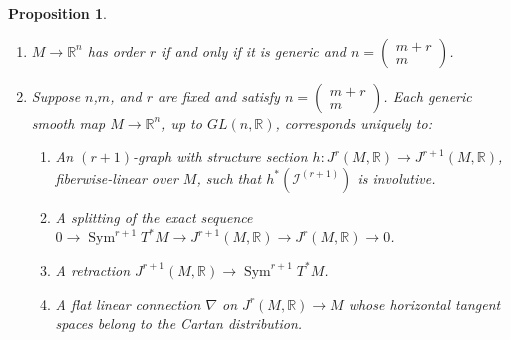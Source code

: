 \documentclass[12pt]{article}
\numberwithin{equation}{section}
\theoremstyle{plain}
\newtheorem{proposition}[definition]{Proposition}
\theoremstyle{definition}
\newcommand{\GL}{GL}
\newcommand{\R}{\mathbb{R}}
\newcommand{\ra}{\rightarrow}
\begin{document}
\begin{proposition}\label{cag}\
\begin{enumerate}
\item{\label{genlc}$M\ra \R^{n}$ has order $r$ if and only if it is generic and $n=\begin{pmatrix}m+r \\ m\end{pmatrix}$.}
\item{\label{eql}Suppose $n$,$m$, and $r$ are fixed and satisfy $n=\begin{pmatrix}m+r \\ m\end{pmatrix}$. Each generic smooth map $M\ra \R^{n}$, up to $\GL(n,\R)$, corresponds uniquely to:
\begin{enumerate}
\item{\label{flom}An $(r+1)$-graph with structure section $h:J^{r}(M,\R)\ra J^{r+1}(M,\R)$, fiberwise-linear over $M$, such that $h^{*}(\mathcal{I}^{(r+1)})$ is involutive.}
\item{\label{slom}A splitting of the exact sequence $0\ra\operatorname{Sym}^{r+1}T^{*}M\ra J^{r+1}(M,\R)\ra J^{r}(M,\R)\ra 0$.}
\item{\label{rlom}A retraction $J^{r+1}(M,\R)\ra\operatorname{Sym}^{r+1}T^{*}M$.}
\item{\label{connfl}A flat linear connection $\nabla$ on $J^{r}(M,\R)\ra M$ whose horizontal tangent spaces belong to the Cartan distribution.}
\end{enumerate}}
\end{enumerate}
\end{proposition}
\end{document}
